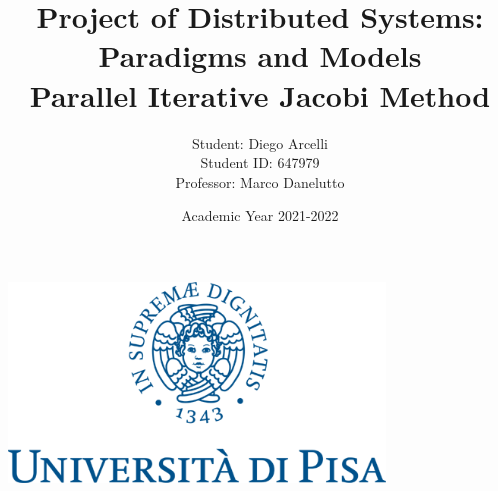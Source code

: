 \documentclass[12pt]{article}
\begin{document}
	
	\begin{titlepage}
		
		\title{Project of Distributed Systems: Paradigms and Models \\
		Parallel Iterative Jacobi Method}
		\author{Student: Diego Arcelli\\ Student ID: 647979 \\
			Professor: Marco  Danelutto}
		\date{Academic Year 2021-2022}
		\maketitle
		\centering
		\includegraphics[width=10cm]{./images/unipi_logo.png}
		
	\end{titlepage}
	
	\tableofcontents
	\newpage
	
\end{document}
